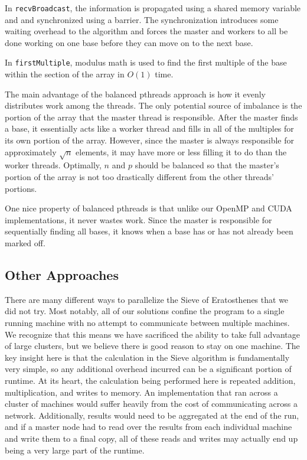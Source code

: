 \documentclass[11pt,twocolumn]{article}
\begin{document}
In \texttt{recvBroadcast}, the information is propagated using a shared
memory variable and and synchronized using a barrier. The synchronization 
introduces some waiting overhead to the algorithm and forces the master 
and workers to all be done working on one base before they can move 
on to the next base.

In \texttt{firstMultiple}, modulus math is used to find the first
multiple of the base within the section of the array in $O(1)$ time.

The main advantage of the balanced pthreads approach is how it 
evenly distributes work among the threads. The only potential source of 
imbalance is the portion of the array that the master thread is responsible. 
After the master finds a base, it essentially acts like a worker thread 
and fills in all of the multiples for its own portion of the array. 
However, since the master is always responsible for approximately 
$\sqrt{n}$ elements, it may have more or less filling it to do than 
the worker threads. Optimally, $n$ and $p$ should be balanced so that the
master's portion of the array is not too drastically different from 
the other threads' portions.

One nice property of balanced pthreads is that unlike our OpenMP and CUDA
implementations, it never wastes work. Since the master is responsible for
sequentially finding all bases, it knows when a base has or has not
already been marked off.

\subsection{Other Approaches}\label{othersection}

There are many different ways to parallelize the Sieve of Eratosthenes
that we did not try. Most notably, all of our solutions confine the program
to a single running machine with no attempt to communicate between
multiple machines. We recognize that this means we have sacrificed the
ability to take full advantage of large clusters, but we believe there
is good reason to stay on one machine. The key insight here is that
the calculation in the Sieve algorithm is fundamentally very simple, so any
additional overhead incurred can be a significant portion of runtime. At
its heart, the calculation being performed here is repeated addition,
multiplication, and writes to memory. An implementation that ran across
a cluster of machines would suffer heavily from the cost of communicating
across a network. Additionally, results would need to be aggregated
at the end of the run, and if a master node had to read over the results
from each individual machine and write them to a final copy, all of these
reads and writes may actually end up being a very large part of the runtime.
\end{document}
